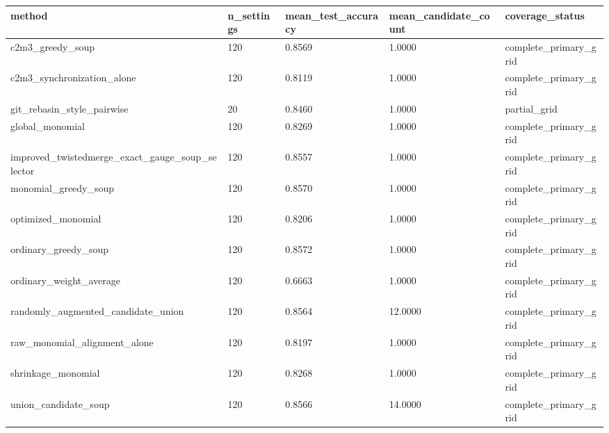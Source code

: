 \begin{tabular}{lllll}
\toprule
method & n_settings & mean_test_accuracy & mean_candidate_count & coverage_status\\
\midrule
c2m3\_greedy\_soup & 120 & 0.8569 & 1.0000 & complete\_primary\_grid\\
c2m3\_synchronization\_alone & 120 & 0.8119 & 1.0000 & complete\_primary\_grid\\
git\_rebasin\_style\_pairwise & 20 & 0.8460 & 1.0000 & partial\_grid\\
global\_monomial & 120 & 0.8269 & 1.0000 & complete\_primary\_grid\\
improved\_twistedmerge\_exact\_gauge\_soup\_selector & 120 & 0.8557 & 1.0000 & complete\_primary\_grid\\
monomial\_greedy\_soup & 120 & 0.8570 & 1.0000 & complete\_primary\_grid\\
optimized\_monomial & 120 & 0.8206 & 1.0000 & complete\_primary\_grid\\
ordinary\_greedy\_soup & 120 & 0.8572 & 1.0000 & complete\_primary\_grid\\
ordinary\_weight\_average & 120 & 0.6663 & 1.0000 & complete\_primary\_grid\\
randomly\_augmented\_candidate\_union & 120 & 0.8564 & 12.0000 & complete\_primary\_grid\\
raw\_monomial\_alignment\_alone & 120 & 0.8197 & 1.0000 & complete\_primary\_grid\\
shrinkage\_monomial & 120 & 0.8268 & 1.0000 & complete\_primary\_grid\\
union\_candidate\_soup & 120 & 0.8566 & 14.0000 & complete\_primary\_grid\\
\bottomrule
\end{tabular}
